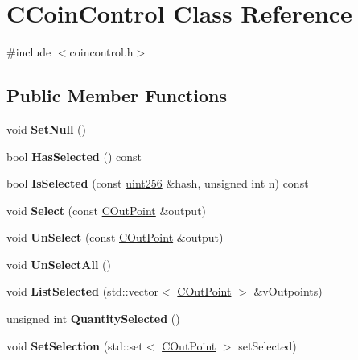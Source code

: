 \hypertarget{class_c_coin_control}{}\section{C\+Coin\+Control Class Reference}
\label{class_c_coin_control}


{\ttfamily \#include $<$coincontrol.\+h$>$}

\subsection*{Public Member Functions}
\begin{DoxyCompactItemize}
\item 
\mbox{\label{class_c_coin_control_aadca0a9e82e1e6d84dff4649e1d29d31}} 
void {\bfseries Set\+Null} ()
\item 
\mbox{\label{class_c_coin_control_a20b259681a7c62b2119256a4862091ac}} 
bool {\bfseries Has\+Selected} () const
\item 
\mbox{\label{class_c_coin_control_adcd674d510015f3212e489ab6bd74067}} 
bool {\bfseries Is\+Selected} (const \mbox{\hyperlink{classuint256}{uint256}} \&hash, unsigned int n) const
\item 
\mbox{\label{class_c_coin_control_a7903e85623ba9b21583bd4018d17546c}} 
void {\bfseries Select} (const \mbox{\hyperlink{class_c_out_point}{C\+Out\+Point}} \&output)
\item 
\mbox{\label{class_c_coin_control_a7f9b8135840df5907bc49a4c5cb19ba4}} 
void {\bfseries Un\+Select} (const \mbox{\hyperlink{class_c_out_point}{C\+Out\+Point}} \&output)
\item 
\mbox{\label{class_c_coin_control_a78bc21b1698e6ae5e6c2fef9758db39c}} 
void {\bfseries Un\+Select\+All} ()
\item 
\mbox{\label{class_c_coin_control_a176b3a32b5f623fe25b8e61ca561422e}} 
void {\bfseries List\+Selected} (std\+::vector$<$ \mbox{\hyperlink{class_c_out_point}{C\+Out\+Point}} $>$ \&v\+Outpoints)
\item 
\mbox{\label{class_c_coin_control_afa6598ec7f1a77214480b76698e2f7f6}} 
unsigned int {\bfseries Quantity\+Selected} ()
\item 
\mbox{\label{class_c_coin_control_a4593e2dcebfdaa7cdd8eb461887eaec4}} 
void {\bfseries Set\+Selection} (std\+::set$<$ \mbox{\hyperlink{class_c_out_point}{C\+Out\+Point}} $>$ set\+Selected)
\end{DoxyCompactItemize}
